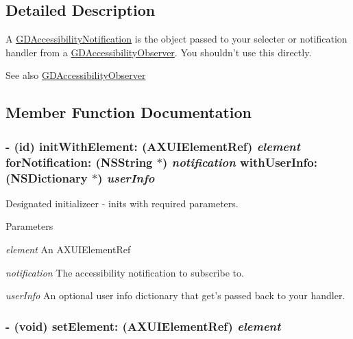 \subsection{Detailed Description}
A \hyperlink{interface_g_d_accessibility_notification}{GDAccessibilityNotification} is the object passed to your selecter or notification handler from a \hyperlink{interface_g_d_accessibility_observer}{GDAccessibilityObserver}. You shouldn't use this directly.

\begin{DoxySeeAlso}{See also}
\hyperlink{interface_g_d_accessibility_observer}{GDAccessibilityObserver} 
\end{DoxySeeAlso}


\subsection{Member Function Documentation}
\hypertarget{interface_g_d_accessibility_notification_a79fa1997f1e26f0f63f4b2e16ec4a7b8}{
\subsubsection[{initWithElement:forNotification:withUserInfo:}]{\setlength{\rightskip}{0pt plus 5cm}-\/ (id) initWithElement: (AXUIElementRef) {\em element}\/ forNotification: (NSString $\ast$) {\em notification}\/ withUserInfo: (NSDictionary $\ast$) {\em userInfo}}}
\label{interface_g_d_accessibility_notification_a79fa1997f1e26f0f63f4b2e16ec4a7b8}


Designated initializeer -\/ inits with required parameters. 
\begin{DoxyParams}{Parameters}
\item[{\em element}]An AXUIElementRef \item[{\em notification}]The accessibility notification to subscribe to. \item[{\em userInfo}]An optional user info dictionary that get's passed back to your handler. \end{DoxyParams}
\hypertarget{interface_g_d_accessibility_notification_a2dcdd48bb0572d48810026fed1577b9c}{
\subsubsection[{setElement:}]{\setlength{\rightskip}{0pt plus 5cm}-\/ (void) setElement: (AXUIElementRef) {\em element}}}
\label{interface_g_d_accessibility_notification_a2dcdd48bb0572d48810026fed1577b9c}


